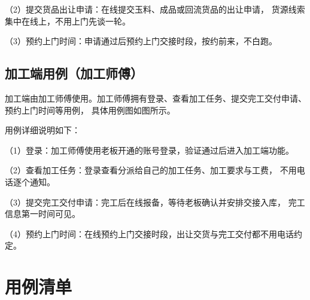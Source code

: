 \noindent（2）提交货品出让申请：在线提交玉料、成品或回流货品的出让申请，
货源线索集中在线上，不用上门先谈一轮。

\noindent（3）预约上门时间：申请通过后预约上门交接时段，按约前来，不白跑。

\subsection{加工端用例（加工师傅）}

加工端由加工师傅使用。加工师傅拥有登录、查看加工任务、提交完工交付申请、预约上门时间等用例，
具体用例图如图所示。


用例详细说明如下：

\noindent（1）登录：加工师傅使用老板开通的账号登录，验证通过后进入加工端功能。

\noindent（2）查看加工任务：登录查看分派给自己的加工任务、加工要求与工费，
不用电话逐个通知。

\noindent（3）提交完工交付申请：完工后在线报备，等待老板确认并安排交接入库，
完工信息第一时间可见。

\noindent（4）预约上门时间：在线预约上门交接时段，出让交货与完工交付都不用电话约定。

\section{用例清单}

